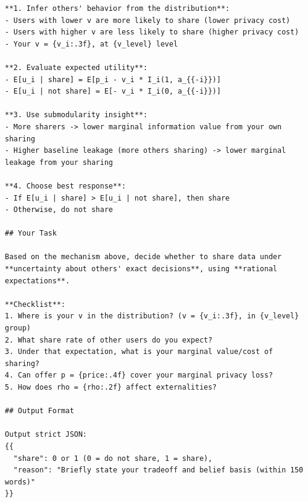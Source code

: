 \begin{table}[t]
{\begin{minipage}{0.97\linewidth}
\begin{verbatim}
**1. Infer others' behavior from the distribution**:
- Users with lower v are more likely to share (lower privacy cost)
- Users with higher v are less likely to share (higher privacy cost)
- Your v = {v_i:.3f}, at {v_level} level

**2. Evaluate expected utility**:
- E[u_i | share] = E[p_i - v_i * I_i(1, a_{{-i}})]
- E[u_i | not share] = E[- v_i * I_i(0, a_{{-i}})]

**3. Use submodularity insight**:
- More sharers -> lower marginal information value from your own sharing
- Higher baseline leakage (more others sharing) -> lower marginal leakage from your sharing

**4. Choose best response**:
- If E[u_i | share] > E[u_i | not share], then share
- Otherwise, do not share

## Your Task

Based on the mechanism above, decide whether to share data under **uncertainty about others' exact decisions**, using **rational expectations**.

**Checklist**:
1. Where is your v in the distribution? (v = {v_i:.3f}, in {v_level} group)
2. What share rate of other users do you expect?
3. Under that expectation, what is your marginal value/cost of sharing?
4. Can offer p = {price:.4f} cover your marginal privacy loss?
5. How does rho = {rho:.2f} affect externalities?

## Output Format

Output strict JSON:
{{
  "share": 0 or 1 (0 = do not share, 1 = share),
  "reason": "Briefly state your tradeoff and belief basis (within 150 words)"
}}
\end{verbatim}
  \end{minipage}}
\end{table}
